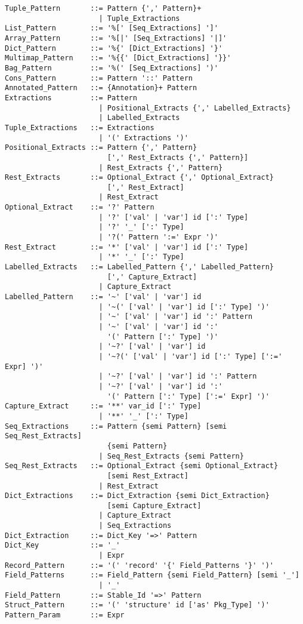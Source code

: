\begin{lstlisting}
Tuple_Pattern       ::= Pattern {',' Pattern}+
                      | Tuple_Extractions
List_Pattern        ::= '%[' [Seq_Extractions] ']'
Array_Pattern       ::= '%[|' [Seq_Extractions] '|]'
Dict_Pattern        ::= '%{' [Dict_Extractions] '}'
Multimap_Pattern    ::= '%{{' [Dict_Extractions] '}}'
Bag_Pattern         ::= '%(' [Seq_Extractions] ')'
Cons_Pattern        ::= Pattern '::' Pattern
Annotated_Pattern   ::= {Annotation}+ Pattern
Extractions         ::= Pattern 
                      | Positional_Extracts {',' Labelled_Extracts}
                      | Labelled_Extracts
Tuple_Extractions   ::= Extractions
                      | '(' Extractions ')'
Positional_Extracts ::= Pattern {',' Pattern} 
                        [',' Rest_Extracts {',' Pattern}]
                      | Rest_Extracts {',' Pattern}
Rest_Extracts       ::= Optional_Extract {',' Optional_Extract} 
                        [',' Rest_Extract]
                      | Rest_Extract
Optional_Extract    ::= '?' Pattern
                      | '?' ['val' | 'var'] id [':' Type]
                      | '?' '_' [':' Type]
                      | '?(' Pattern ':=' Expr ')'
Rest_Extract        ::= '*' ['val' | 'var'] id [':' Type]
                      | '*' '_' [':' Type]
Labelled_Extracts   ::= Labelled_Pattern {',' Labelled_Pattern} 
                        [',' Capture_Extract]
                      | Capture_Extract
Labelled_Pattern    ::= '~' ['val' | 'var'] id 
                      | '~(' ['val' | 'var'] id [':' Type] ')'
                      | '~' ['val' | 'var'] id ':' Pattern
                      | '~' ['val' | 'var'] id ':' 
                        '(' Pattern [':' Type] ')'
                      | '~?' ['val' | 'var'] id
                      | '~?(' ['val' | 'var'] id [':' Type] [':=' Expr] ')'
                      | '~?' ['val' | 'var'] id ':' Pattern
                      | '~?' ['val' | 'var'] id ':' 
                        '(' Pattern [':' Type] [':=' Expr] ')'
Capture_Extract     ::= '**' var_id [':' Type]
                      | '**' '_' [':' Type]
Seq_Extractions     ::= Pattern {semi Pattern} [semi Seq_Rest_Extracts] 
                        {semi Pattern}
                      | Seq_Rest_Extracts {semi Pattern}
Seq_Rest_Extracts   ::= Optional_Extract {semi Optional_Extract} 
                        [semi Rest_Extract]
                      | Rest_Extract
Dict_Extractions    ::= Dict_Extraction {semi Dict_Extraction}
                        [semi Capture_Extract]
                      | Capture_Extract
                      | Seq_Extractions
Dict_Extraction     ::= Dict_Key '=>' Pattern
Dict_Key            ::= '_'
                      | Expr
Record_Pattern      ::= '(' 'record' '{' Field_Patterns '}' ')'
Field_Patterns      ::= Field_Pattern {semi Field_Pattern} [semi '_']
                      | '_'
Field_Pattern       ::= Stable_Id '=>' Pattern
Struct_Pattern      ::= '(' 'structure' id ['as' Pkg_Type] ')'
Pattern_Param       ::= Expr
\end{lstlisting}

